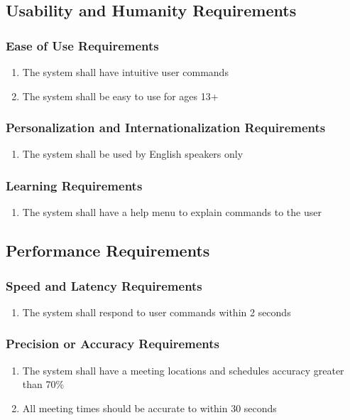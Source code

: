 \documentclass[12pt, titlepage]{article}
\begin{document}
\subsection{Usability and Humanity Requirements}
\subsubsection{Ease of Use Requirements}
\begin{enumerate}[start=1, label={UH\arabic*.}]
    \item The system shall have intuitive user commands
    \item The system shall be easy to use for ages 13+
\end{enumerate}
\subsubsection{Personalization and Internationalization Requirements}
\begin{enumerate}[start=3, label={UH\arabic*.}]
    \item The system shall be used by English speakers only
\end{enumerate}
\subsubsection{Learning Requirements}
\begin{enumerate}[start=4, label={UH\arabic*.}]
    \item The system shall have a help menu to explain commands to the user
\end{enumerate}

\subsection{Performance Requirements}
\subsubsection{Speed and Latency Requirements}
\begin{enumerate}[start=1, label={P\arabic*.}]
    \item The system shall respond to user commands within 2 seconds
\end{enumerate}
\subsubsection{Precision or Accuracy Requirements}
\begin{enumerate}[start=2, label={P\arabic*.}]
    \item The system shall have a meeting locations and schedules accuracy greater than 70\%
    \item All meeting times should be accurate to within 30 seconds
\end{enumerate}
\end{document}
